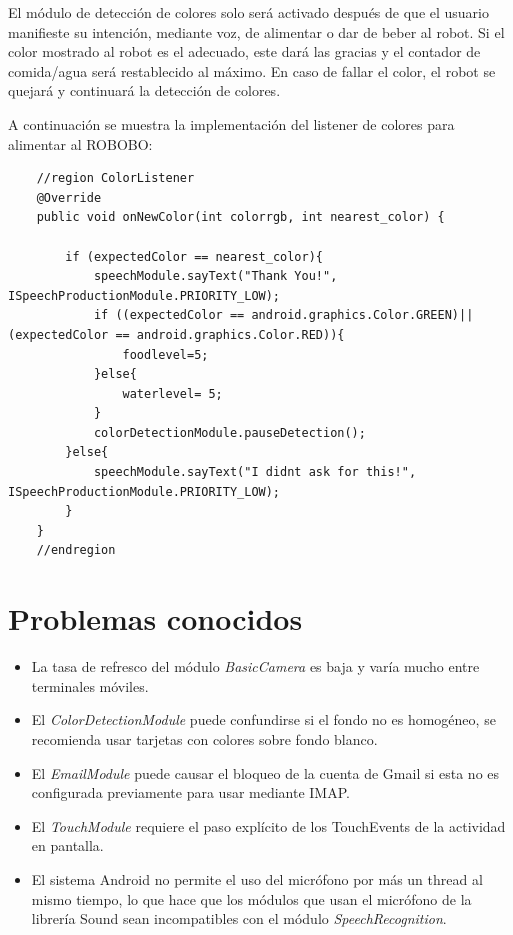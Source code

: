 El módulo de detección de colores solo será activado después de que el usuario manifieste su intención, mediante voz, de alimentar o dar de beber al robot.
Si el color mostrado al robot es el adecuado, este dará las gracias y el contador de comida/agua será restablecido al máximo. En caso de fallar el color, el robot se quejará y continuará la detección de colores.


A continuación se muestra la implementación del listener de colores para alimentar al ROBOBO:
\begin{lstlisting}
	//region ColorListener
    @Override
    public void onNewColor(int colorrgb, int nearest_color) {

        if (expectedColor == nearest_color){
            speechModule.sayText("Thank You!", ISpeechProductionModule.PRIORITY_LOW);
            if ((expectedColor == android.graphics.Color.GREEN)||(expectedColor == android.graphics.Color.RED)){
                foodlevel=5;
            }else{
                waterlevel= 5;
            }
            colorDetectionModule.pauseDetection();
        }else{
            speechModule.sayText("I didnt ask for this!", ISpeechProductionModule.PRIORITY_LOW);
        }
    }
    //endregion
\end{lstlisting}








\newpage
\section{Problemas conocidos}
\begin{itemize}
	\item La tasa de refresco del módulo \textit{BasicCamera} es baja y varía mucho entre terminales móviles.
	\item El \textit{ColorDetectionModule} puede confundirse si el fondo no es homogéneo, se recomienda usar tarjetas con colores sobre fondo blanco.
	\item El \textit{EmailModule} puede causar el bloqueo de la cuenta de Gmail si esta no es configurada previamente para usar mediante IMAP.
	\item El \textit{TouchModule} requiere el paso explícito de los TouchEvents de la actividad en pantalla.
	\item El sistema Android no permite el uso del micrófono por más un thread al mismo tiempo, lo que hace que los módulos que usan el micrófono de la librería Sound sean incompatibles con el módulo \textit{SpeechRecognition}.
\end{itemize}
\label{sec:known_issues}
    

